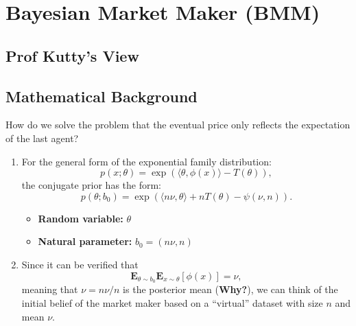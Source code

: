 \documentclass{article}
\begin{document}
\section{Bayesian Market Maker (BMM)}
\subsection{Prof Kutty's View}
\subsection*{Mathematical Background}
How do we solve the problem that the eventual price only reflects the expectation of the last agent?
\begin{enumerate}
    \item For the general form of the exponential family distribution:
          \[ p(x;\theta)=\exp\left(\langle\theta,\phi(x)\rangle-T(\theta)\right), \]
          the conjugate prior has the form:
          \[ p(\theta;b_0)=\exp(\langle n\nu,\theta\rangle+nT(\theta)-\psi(\nu,n)). \]
          \begin{itemize}
              \item \textbf{Random variable:} $\theta$
              \item \textbf{Natural parameter:} $b_0=(n\nu,n)$
          \end{itemize}
    \item Since it can be verified that \[ \mathbf{E}_{\theta\sim b_0}\mathbf{E}_{x\sim\theta}[\phi(x)]=\nu, \] meaning that $\nu=n\nu/n$ is the posterior mean (\textbf{Why?}), we can think of the initial belief of the market maker based on a ``virtual'' dataset with size $n$ and mean $\nu$.
\end{enumerate}
\end{document}
